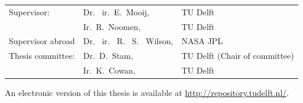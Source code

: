 \begin{titlepage}
\begin{center}
\vfill

\begin{tabular}{lll}
    Supervisor: & Dr. \ ir.\ E.\ Mooij, & TU Delft \\
    & Ir.\ R.\ Noomen, & TU Delft \\
    Supervisor abroad & Dr. \ ir. \ R. \ S. \ Wilson, & NASA JPL \\
    Thesis committee:
        & Dr.\ D.\ Stam, & TU Delft (Chair of committee) \\
        & Ir.\ K.\ Cowan, & TU Delft
\end{tabular}

\bigskip
\bigskip

\bigskip
\bigskip
An electronic version of this thesis is available at \url{http://repository.tudelft.nl/}.

\end{center}



\end{titlepage}

